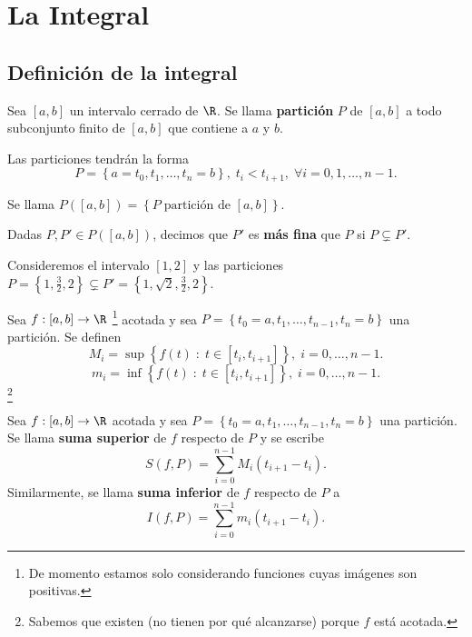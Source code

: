 \chapter{La Integral}
\section{Definición de la integral}
\begin{fdefinition}[Partición]
	\normalfont Sea $\displaystyle \left[a,b\right]  $ un intervalo cerrado de $\displaystyle \R $. Se llama \textbf{partición} $\displaystyle P $ de $\displaystyle [a,b] $ a todo subconjunto finito de $\displaystyle [a,b] $ que contiene a $\displaystyle a $ y $\displaystyle b $. 
\end{fdefinition}
\begin{observation}
\normalfont Las particiones tendrán la forma
\[ P = \left\{ a = t_{0}, t_{1}, \ldots, t_{n} = b\right\}, \; t_{i} < t_{i+1}, \; \forall i = 0,1, \ldots, n-1 .\]
\begin{notation}
\normalfont Se llama $\displaystyle P\left([a,b]\right) = \left\{ P \; \text{partición de } [a,b]\right\} $.
\end{notation}
\end{observation}
\begin{fdefinition}[]
	\normalfont Dadas $\displaystyle P, P' \in P\left([a,b]\right) $, decimos que $\displaystyle P' $ es \textbf{más fina} que $\displaystyle P $ si $\displaystyle P \subsetneq P' $.
\end{fdefinition}
\begin{eg}
	\normalfont Consideremos el intervalo $\displaystyle [1,2] $ y las particiones $\displaystyle P = \left\{ 1, \frac{3}{2}, 2\right\} \subsetneq P' = \left\{ 1, \sqrt{2},\frac{3}{2}, 2\right\}  $.
\end{eg}
\begin{fdefinition}[]
	\normalfont Sea $\displaystyle f: [a,b] \to \R $ \footnote{De momento estamos solo considerando funciones cuyas imágenes son positivas.} acotada y sea $\displaystyle P = \left\{ t_{0}= a, t_{1}, \ldots, t_{n-1}, t_{n} = b\right\}  $ una partición. Se definen
	\[ M_{i} = \sup \left\{ f\left(t\right) \; : \; t \in [t_{i}, t_{i+1}]\right\}, \; i = 0, \ldots, n-1  .\]
	\[ m_{i} = \inf \left\{ f\left(t\right) \; : \; t \in [t_{i}, t_{i+1}]\right\}, \; i = 0, \ldots, n-1  .\]
\footnote{Sabemos que existen (no tienen por qué alcanzarse) porque $\displaystyle f $ está acotada.} 	
\end{fdefinition}
\begin{fdefinition}[]
	\normalfont Sea $\displaystyle f : [a,b] \to \R $ acotada y sea $\displaystyle P = \left\{ t_{0}= a, t_{1}, \ldots, t_{n-1}, t_{n} = b\right\}  $ una partición. Se llama \textbf{suma superior} de $\displaystyle f $ respecto de $\displaystyle P $ y se escribe 
	\[ S\left(f, P\right) = \sum^{n-1}_{i = 0}M_{i}\left(t_{i+1}-t_{i}\right) .\]
	Similarmente, se llama \textbf{suma inferior} de $\displaystyle f $ respecto de $\displaystyle P $ a
	\[ I\left(f,P\right)= \sum^{n-1}_{i = 0}m_{i}\left(t_{i+1}-t_{i}\right) .\]
\end{fdefinition}
